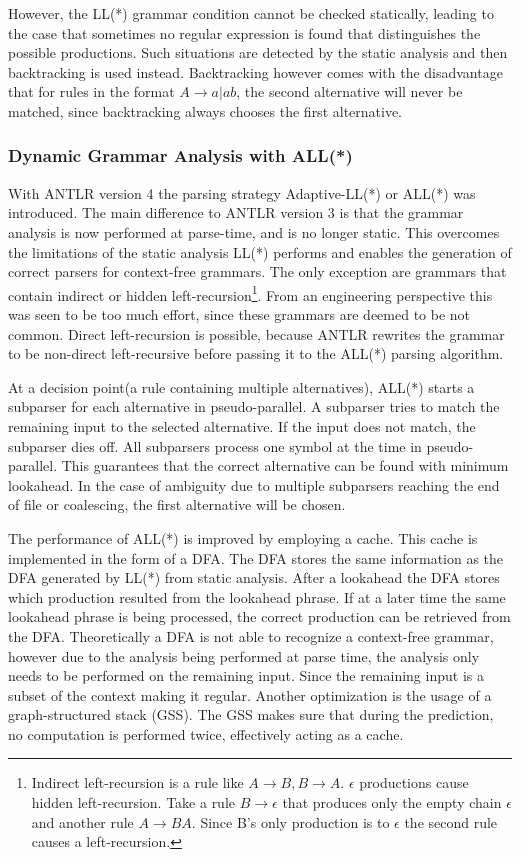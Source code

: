 However, the LL(*) grammar condition cannot be checked statically, leading to the case that sometimes no regular expression is found that distinguishes the possible productions. Such situations are detected by the static analysis and then backtracking is used instead. Backtracking however comes with the disadvantage that for rules in the format $A \rightarrow a | ab$, the second alternative will never be matched, since backtracking always chooses the first alternative. 

\subsubsection{Dynamic Grammar Analysis with ALL(*)}

With ANTLR version 4 the parsing strategy Adaptive-LL(*) or ALL(*) was introduced. The main difference to ANTLR version 3 is that the grammar analysis is now performed at parse-time, and is no longer static. This overcomes the limitations of the static analysis LL(*) performs and enables the generation of correct parsers for context-free grammars. The only exception are grammars that contain indirect or hidden left-recursion\footnote{Indirect left-recursion is a rule like $A \rightarrow B, B \rightarrow A$. $\epsilon$ productions cause hidden left-recursion. Take a rule $B \rightarrow \epsilon$ that produces only the empty chain $\epsilon$ and another rule $A \rightarrow BA$. Since B's only production is to $\epsilon$ the second rule causes a left-recursion. }. From an engineering perspective this was seen to be too much effort, since these grammars are deemed to be not common. Direct left-recursion is possible, because ANTLR rewrites the grammar to be non-direct left-recursive before passing it to the ALL(*) parsing algorithm. 

At a decision point(a rule containing multiple alternatives), ALL(*) starts a subparser for each alternative in pseudo-parallel. A subparser tries to match the remaining input to the selected alternative. If the input does not match, the subparser dies off. All subparsers process one symbol at the time in pseudo-parallel. This guarantees that the correct alternative can be found with minimum lookahead. In the case of ambiguity due to multiple subparsers reaching the end of file or coalescing, the first alternative will be chosen. 

The performance of ALL(*) is improved by employing a cache. This cache is implemented in the form of a DFA. The DFA stores the same information as the DFA generated by LL(*) from static analysis. After a lookahead the DFA stores which production resulted from the lookahead phrase. If at a later time the same lookahead phrase is being processed, the correct production can be retrieved from the DFA. Theoretically a DFA is not able to recognize a context-free grammar, however due to the analysis being performed at parse time, the analysis only needs to be performed on the remaining input. Since the remaining input is a subset of the context making it regular. Another optimization is the usage of a graph-structured stack (GSS). The GSS makes sure that during the prediction, no computation is performed twice, effectively acting as a cache. 


